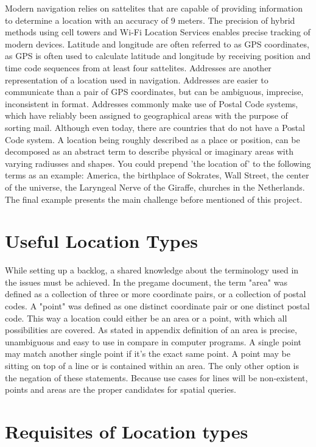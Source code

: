 Modern navigation relies on sattelites that are capable of providing information to determine a location with an accuracy of 9 meters. The precision of hybrid methods using cell towers and Wi-Fi Location Services enables precise tracking of modern devices. Latitude and longitude are often referred to as GPS coordinates, as GPS is often used to calculate latitude and longitude by receiving position and time code sequences from at least four sattelites. Addresses are another representation of a location used in navigation. Addresses are easier to communicate than a pair of GPS coordinates, but can be ambiguous, imprecise, inconsistent in format. Addresses commonly make use of Postal Code systems, which have reliably been assigned to geographical areas with the purpose of sorting mail. Although even today, there are countries that do not have a Postal Code system.
A location being roughly described as a place or position, can be decomposed as an abstract term to describe physical or imaginary areas with varying radiusses and shapes. You could prepend 'the location of' to the following terms as an example: America, the birthplace of Sokrates, Wall Street, the center of the universe, the Laryngeal Nerve of the Giraffe, churches in the Netherlands. The final example presents the main challenge before mentioned of this project.

\section{Useful Location Types}

While setting up a backlog, a shared knowledge about the terminology used in the issues must be achieved. In the pregame document, the term "area" was defined as a collection of three or more coordinate pairs, or a collection of postal codes. A "point" was defined as one distinct coordinate pair or one distinct postal code. This way a location could either be an area or a point, with which all possibilities are covered. As stated in appendix  definition of an area is precise, unambiguous and easy to use in compare in computer programs. A single point may match another single point if it’s the exact same point. A point may be sitting on top of a line or is contained within an area. The only other option is the negation of these statements. Because use cases for lines will be non-existent, points and areas are the proper candidates for spatial queries.

\section{Requisites of Location types}

